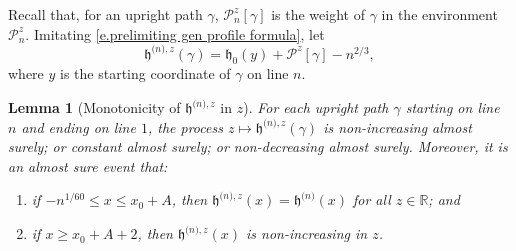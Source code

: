 \documentclass[oneside,final,11pt]{amsart}
\newtheorem{lemma}[thm]{Lemma}
\theoremstyle{definition}
\renewcommand{\L}{\CP}
\newcommand{\fh}{\mathfrak{h}}
\newcommand{\h}{\fh^{{\scriptscriptstyle(}n{\scriptscriptstyle)}}}
\newcommand{\hz}[1]{\fh^{{\scriptscriptstyle(}n{\scriptscriptstyle)},#1}}
\newcommand{\R}{\mathbb{R}}
\newcommand{\1}[1]{\mathbf{1}_{#1}}
\newcommand{\hlim}{\mathfrak{h}}
\newcommand{\ah}[1]{\marginnote{\tiny{\color{green!65!black}[AH: #1]}}}
\newcommand{\CP}{\mathcal{P}}
\numberwithin{equation}{section}
\begin{document}
Recall that, for an upright path $\gamma$, $\L_n^z[\gamma]$ is the weight %
of $\gamma$ in the environment $\L_n^z$. Imitating \eqref{e.prelimiting gen profile formula}, let
%
$$\hz{z}(\gamma) = \hlim_0(y) + \L^z[\gamma] - n^{2/3},$$
%
where $y$ is the starting coordinate of $\gamma$ on line $n$.

\begin{lemma}[Monotonicity of $\hz{z}$ in $z$]\label{l.monotonicity of L^f}
For each upright path $\gamma$ starting on line $n$ and ending on  line $1$, the process $z \mapsto \hz{z}(\gamma)$ is non-increasing almost surely; or constant almost surely; or non-decreasing almost surely. Moreover, it is an almost sure event that:
%
\begin{enumerate}
  \item if $-n^{1/60}\leq x\leq x_0+A$, then $\hz{z}(x) = \h(x)$ for all $z\in \R$; and
  \item if $x\geq x_0+A+2$, then $\hz{z}(x)$ is non-increasing in $z$.
\end{enumerate}
\end{lemma}
\end{document}
